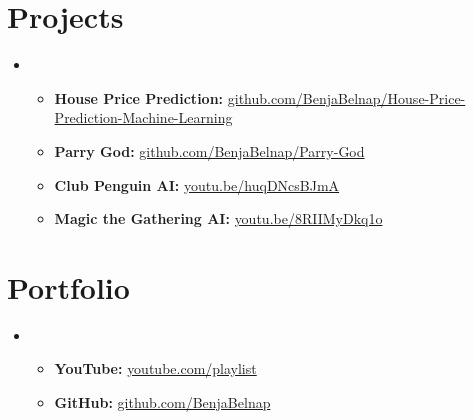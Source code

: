 \documentclass[letterpaper,11pt]{article}
\newcommand{\cvitem}[1]{
  \item\small{
    {#1\vspace{-2pt}}
  }
}
\newcommand{\cvheadingstart}{\begin{itemize}[leftmargin=0in, label={}]}
\newcommand{\cvheadingend}{\end{itemize}}
\newcommand{\cvitemstart}{\begin{itemize}[label=\textopenbullet]\justifying}
\newcommand{\cvitemend}{\end{itemize}\vspace{-5pt}}
\begin{document}
\section{Projects}
\cvheadingstart
\item
\cvitemstart
  \cvitem{\textbf{House Price Prediction:} \href{https://github.com/BenjaBelnap/House-Price-Prediction-Machine-Learning}{github.com/BenjaBelnap/House-Price-Prediction-Machine-Learning}}
  \cvitem{\textbf{Parry God:} \href{https://github.com/BenjaBelnap/Parry-God}{github.com/BenjaBelnap/Parry-God}}
  \cvitem{\textbf{Club Penguin AI:} \href{https://youtu.be/huqDNcsBJmA?si=JeCqGqGiTHdY9so1}{youtu.be/huqDNcsBJmA}}
  \cvitem{\textbf{Magic the Gathering AI:} \href{https://youtu.be/8RIIMyDkq1o?si=IFQelgHKwUcTemNc}{youtu.be/8RIIMyDkq1o}}
\cvitemend
\cvheadingend

\section{Portfolio}
\cvheadingstart
\item
\cvitemstart
  \cvitem{\textbf{YouTube:} \href{https://www.youtube.com/watch?v=8RIIMyDkq1o&list=PLUzrl_qGh1VwDzHbBU4ZeU0BwMCtkR06B}{youtube.com/playlist}}
  \cvitem{\textbf{GitHub:} \href{https://github.com/BenjaBelnap}{github.com/BenjaBelnap}}
\cvitemend
\cvheadingend
\end{document}
